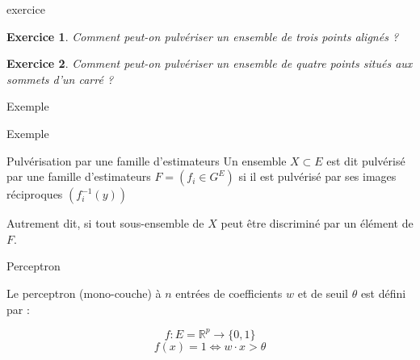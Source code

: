 \documentclass[11pt]{beamer}
\newtheorem{exercice}{Exercice}
\begin{document}
\begin{frame}{exercice}

\begin{exercice}
Comment peut-on pulvériser un ensemble de trois points alignés ?
\end{exercice}
\begin{exercice}
Comment peut-on pulvériser un ensemble de quatre points situés aux sommets d'un carré ?
\end{exercice}

\end{frame}

\begin{frame}{Exemple}
\begin{figure}
\end{figure}
\end{frame}

\begin{frame}{Exemple}
\begin{figure}
\end{figure}
\end{frame}


\begin{frame}{Pulvérisation par une famille d'estimateurs}
Un ensemble $X \subset E$ est dit pulvérisé par une famille d'estimateurs $F=(f_i \in G^E)$ si il est pulvérisé par ses images réciproques $(f^{-1}_i(y))$\\

\vspace{0.2cm}

Autrement dit, si tout sous-ensemble de $X$ peut être discriminé par un élément de $F$. 

\end{frame}

\begin{frame}{Perceptron}

Le perceptron (mono-couche) à $n$ entrées de coefficients $w$ et de seuil $\theta$ est défini par :

$$ f: E=\mathbb{R}^p \longrightarrow \{0,1\}$$
$$ f(x)=1 \Leftrightarrow w\cdot x > \theta$$ 

\end{frame}
\end{document}
